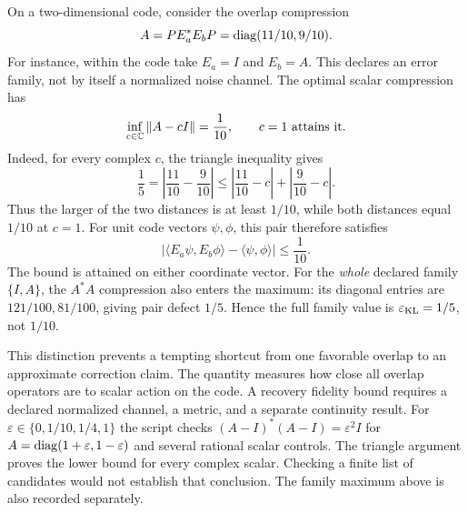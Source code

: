 On a two-dimensional code, consider the overlap compression
\[
A=PE_a^*E_bP=\operatorname{diag}(11/10,9/10).
\]
For instance, within the code take $E_a=I$ and $E_b=A$. This declares an error family, not by itself a normalized noise channel. The optimal scalar compression has
\[
\inf_{c\in\CC}\norm{A-cI}=\frac1{10},\qquad c=1\ \text{attains it}.
\]
Indeed, for every complex $c$, the triangle inequality gives
\[
\frac15=\left|\frac{11}{10}-\frac9{10}\right|
\leq\left|\frac{11}{10}-c\right|+\left|\frac9{10}-c\right|.
\]
Thus the larger of the two distances is at least $1/10$, while both distances equal $1/10$ at $c=1$.
For unit code vectors $\psi,\phi$, this pair therefore satisfies
\[
\left|\langle E_a\psi,E_b\phi\rangle-\langle\psi,\phi\rangle\right|
\leq\frac1{10}.
\]
The bound is attained on either coordinate vector. For the \emph{whole} declared family $\{I,A\}$, the $A^*A$ compression also enters the maximum: its diagonal entries are $121/100,81/100$, giving pair defect $1/5$. Hence the full family value is $\varepsilon_{\rm KL}=1/5$, not $1/10$.

This distinction prevents a tempting shortcut from one favorable overlap to an approximate correction claim. The quantity measures how close all overlap operators are to scalar action on the code. A recovery fidelity bound requires a declared normalized channel, a metric, and a separate continuity result.
For $\varepsilon\in\{0,1/10,1/4,1\}$ the script checks $(A-I)^*(A-I)=\varepsilon^2I$ for $A=\operatorname{diag}(1+\varepsilon,1-\varepsilon)$ and several rational scalar controls. The triangle argument proves the lower bound for every complex scalar. Checking a finite list of candidates would not establish that conclusion. The family maximum above is also recorded separately.

